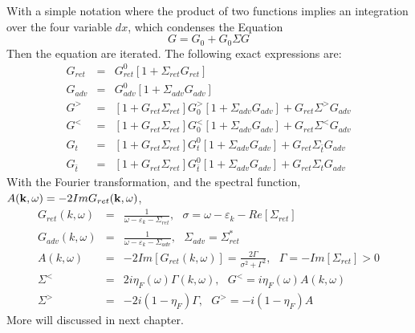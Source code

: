 With a simple notation where the product of two functions implies an integration over the four variable $dx$, which condenses the Equation
\begin{equation}
  G = G_0 + G_0 \Sigma G \label{2.158}
\end{equation}
Then the equation are iterated.
The following exact expressions are:
\begin{eqnarray}
  G_{ret} &=& G_{ret}^0[1+\Sigma_{ret}G_{ret}] \nonumber \\
  G_{adv} &=& G_{adv}^0[1+\Sigma_{adv}G_{adv}] \nonumber \\
  G^> &=& [1+G_{ret}\Sigma_{ret}]G^>_0[1+\Sigma_{adv}G_{adv}] + G_{ret} \Sigma^>G_{adv} \nonumber \\
  G^< &=& [1+G_{ret}\Sigma_{ret}]G^<_0[1+\Sigma_{adv}G_{adv}] + G_{ret} \Sigma^<G_{adv} \nonumber \\
  G_t &=& [1+G_{ret}\Sigma_{ret}]G^0_t[1+\Sigma_{adv}G_{adv}] + G_{ret} \Sigma_{\bar{t}}G_{adv} \nonumber \\
  G_{\bar{t}} &=& [1+G_{ret}\Sigma_{ret}]G^0_{\bar{t}}[1+\Sigma_{adv}G_{adv}] + G_{ret} \Sigma_tG_{adv} \label{2.159}
\end{eqnarray}
With the Fourier transformation, and the spectral function, $A(\mathbf{k},\omega) = -2ImG_{ret}(\mathbf{k},\omega)$,
\begin{eqnarray}
G_{ret}(k,\omega)&=& \frac{1}{\omega -\varepsilon_k -\Sigma_{ret}}, ~ ~ ~ \sigma = \omega -\varepsilon_k -Re[\Sigma_{ret}] \nonumber\\
G_{adv}(k,\omega)&=& \frac{1}{\omega -\varepsilon_k -\Sigma_{adv}}, ~ ~ ~ \Sigma_{adv}= \Sigma_{ret}^* \nonumber\\
A(k,\omega) &=& -2Im[G_{ret}(k,\omega)] = \frac{2\Gamma}{\sigma^2 +\Gamma^2}, ~ ~ ~ \Gamma = - Im[\Sigma_{ret}]>0 \nonumber\\
\Sigma^< &=& 2i \eta_F(\omega) \Gamma(k,\omega), ~ ~ ~ G^< = i\eta_F(\omega)A(k,\omega) \nonumber\\
\Sigma^>&=& -2i(1-\eta_F)\Gamma, ~ ~ ~ G^>=-i(1-\eta_F)A   \label{2.160}
\end{eqnarray}
More will discussed in next chapter.

